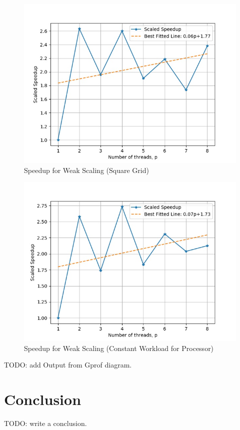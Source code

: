 \documentclass{article}
\begin{document}
\begin{figure}[h!]
	\centering
	\includegraphics[width=0.8\columnwidth]{../weak_scaling.jpg}
	\caption{Speedup for Weak Scaling (Square Grid)}
	\label{fig:weak_scaling}
\end{figure}

\begin{figure}[h!]
	\centering
	\includegraphics[width=0.8\columnwidth]{../weak_scaling_v2.jpg}
	\caption{Speedup for Weak Scaling (Constant Workload for Processor)}
	\label{fig:weak_scaling_v2}
\end{figure}

TODO: add Output from Gprof diagram.

\section{Conclusion}

TODO: write a conclusion.
\end{document}
